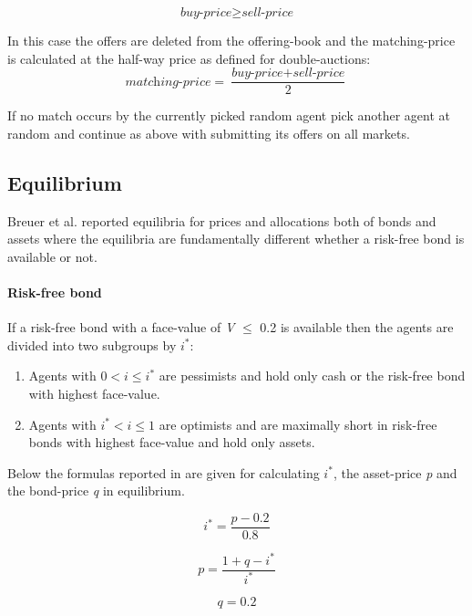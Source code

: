 \documentclass[../Bachelorarbeit.tex]{subfiles}
\begin{document}
\begin{equation}
\textit{buy-price} \geq \textit{sell-price}
\end{equation}

In this case the offers are deleted from the offering-book and the matching-price is calculated at the half-way price as defined for double-auctions:
\begin{equation}
\textit{matching-price} = \frac{\textit{buy-price} + \textit{sell-price}}{2}
\end{equation}

If no match occurs by the currently picked random agent pick another agent at random and continue as above with submitting its offers on all markets.

\subsection{Equilibrium}
Breuer et al. reported equilibria for prices and allocations both of bonds and assets where the equilibria are fundamentally different whether a risk-free bond is available or not.

\paragraph{Risk-free bond}
If a risk-free bond with a face-value of \textit{V} $\leq$ 0.2 is available then the agents are divided into two subgroups by $i^*$:

\begin{enumerate}
\item Agents with $0 < i \leq i^*$ are pessimists and hold only cash or the risk-free bond with highest face-value.
\item Agents with $i^* < i \leq 1$ are optimists and are maximally short in risk-free bonds with highest face-value and hold only assets.
\end{enumerate}

Below the formulas reported in \cite{Breuer2015} are given for calculating $i^*$, the asset-price \textit{p} and the bond-price \textit{q} in equilibrium.

\begin{equation}
i^* = \frac{p - 0.2}{0.8}
\end{equation}

\begin{equation}
p = \frac{1 + q - i^*}{i^*}
\end{equation}

\begin{equation}
q = 0.2
\end{equation}
\end{document}
